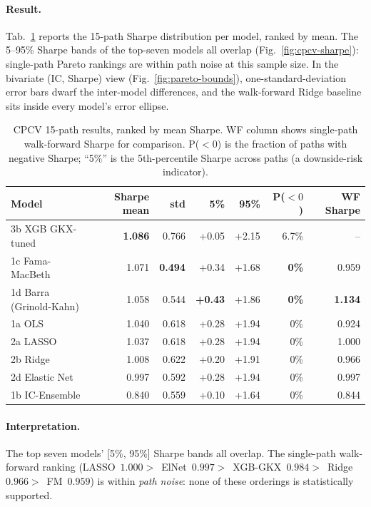 \documentclass[11pt]{article}
\begin{document}
\paragraph{Result.}
Tab.~\ref{tab:cpcv} reports the 15-path Sharpe distribution per model,
ranked by mean. The 5--95\% Sharpe bands of the top-seven models all
overlap (Fig.~\ref{fig:cpcv-sharpe}): single-path Pareto rankings are
within path noise at this sample size. In the bivariate (IC, Sharpe)
view (Fig.~\ref{fig:pareto-bounds}), one-standard-deviation error
bars dwarf the inter-model differences, and the walk-forward Ridge
baseline sits inside every model's error ellipse.

\begin{table}[t]
\centering
\caption{CPCV 15-path results, ranked by mean Sharpe. WF column shows
single-path walk-forward Sharpe for comparison. P($<0$) is the fraction
of paths with negative Sharpe; ``5\%'' is the 5th-percentile Sharpe
across paths (a downside-risk indicator).}
\label{tab:cpcv}
\small
\begin{tabular}{l r r r r r r}
\toprule
Model & Sharpe mean & std & 5\% & 95\% & P($<0$) & WF Sharpe \\
\midrule
3b XGB GKX-tuned       & \textbf{1.086} & 0.766 & +0.05 & +2.15 & 6.7\% & --   \\
1c Fama-MacBeth        & 1.071 & \textbf{0.494} & +0.34 & +1.68 & \textbf{0\%} & 0.959 \\
1d Barra (Grinold-Kahn) & 1.058 & 0.544 & \textbf{+0.43} & +1.86 & \textbf{0\%} & \textbf{1.134} \\
1a OLS                 & 1.040 & 0.618 & +0.28 & +1.94 & 0\%   & 0.924 \\
2a LASSO               & 1.037 & 0.618 & +0.28 & +1.94 & 0\%   & 1.000 \\
2b Ridge               & 1.008 & 0.622 & +0.20 & +1.91 & 0\%   & 0.966 \\
2d Elastic Net         & 0.997 & 0.592 & +0.28 & +1.94 & 0\%   & 0.997 \\
1b IC-Ensemble         & 0.840 & 0.559 & +0.10 & +1.64 & 0\%   & 0.844 \\
\bottomrule
\end{tabular}
\end{table}

\paragraph{Interpretation.}
The top seven models' [5\%, 95\%] Sharpe bands all overlap. The
single-path walk-forward ranking
(LASSO~$1.000>$~ElNet~$0.997>$~XGB-GKX~$0.984>$~Ridge~$0.966>$~FM~$0.959$)
is within \emph{path noise}: none of these orderings is statistically
supported.
\end{document}

